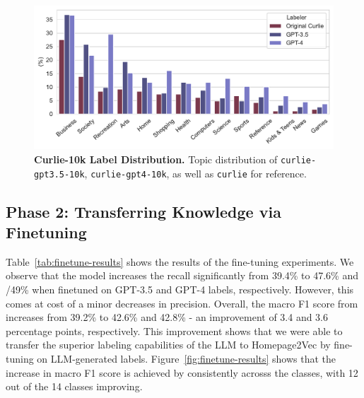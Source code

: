 \begin{figure}[!ht]
    \centering
    \includegraphics[width=.8\columnwidth]{figures/curlie-10k-dist.pdf}
    \caption{\textbf{Curlie-10k Label Distribution.} Topic distribution of \texttt{curlie-gpt3.5-10k}, \texttt{curlie-gpt4-10k}, as well as \texttt{curlie} for reference.}
    \label{fig:curlie-10k-dist}
\end{figure}

\subsection*{Phase 2: Transferring Knowledge via Finetuning}

Table~\ref{tab:finetune-results} shows the results of the fine-tuning experiments. 
We observe that the model increases the recall significantly from 39.4\% to 47.6\% and /49\% when finetuned on GPT-3.5 and GPT-4 labels, respectively.
However, this comes at cost of a minor decreases in precision. Overall, the macro F1 score from increases from 39.2\% to 42.6\% and 42.8\% - an improvement of 3.4 and 3.6 percentage points, respectively.
This improvement shows that we were able to transfer the superior labeling capabilities of the LLM to Homepage2Vec by fine-tuning on LLM-generated labels. Figure~\ref{fig:finetune-results} shows that the increase in macro F1 score is achieved by consistently acrosss the classes, with 12 out of the 14 classes improving.





